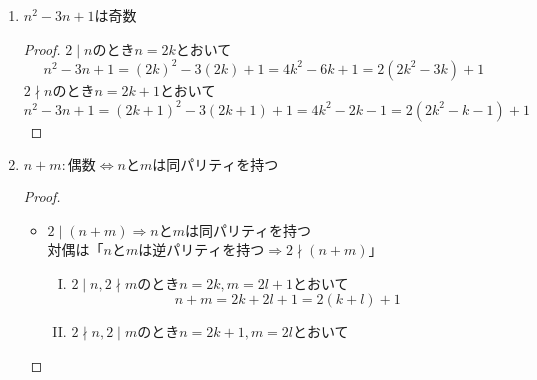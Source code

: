 \documentclass[a4paper,12pt]{ltjsarticle}
\begin{document}
\begin{enumerate}[(1)]
\begin{proof}
\begin{itemize}
                    \begin{equation*}
                        3n^3 = 3(2l + 1)^3 = 3(8l^3 + 12l^2 + 6l + 1) = 2(12l^3 + 18l^2 + 9l + 1) + 1
                    \end{equation*}
                    次に，$2 \mid n \Rightarrow 2 \mid 5n^2$を証明する． \\
                    $n = 2m$とおいて
                    \begin{equation*}
                        5n^2 = 5(2m)^2 = 2(10m^2)
                    \end{equation*}
            \end{itemize}
            以上より$2 \mid 5n^2 \Leftrightarrow 2 \mid 3n^3$
        \end{proof}
    \item $n^2 - 3n  + 1$は奇数
        \begin{proof}
            $2 \mid n$のとき$n = 2k$とおいて
            \begin{equation*}
                n^2 - 3n + 1 = (2k)^2 - 3(2k) + 1 = 4k^2 - 6k + 1 = 2(2k^2 - 3k) + 1
            \end{equation*}
            $2 \nmid n$のとき$n = 2k + 1$とおいて
            \begin{equation*}
                n^2 - 3n + 1 = (2k + 1)^2 - 3(2k + 1) + 1 = 4k^2 - 2k - 1 = 2(2k^2 - k - 1) + 1
            \end{equation*}
        \end{proof}
    \item $n + m : 偶数 \Leftrightarrow nとmは同パリティを持つ$
        \begin{proof}
            \quad \\
            \begin{itemize}
                \item $2 \mid (n + m) \Rightarrow nとmは同パリティを持つ$ \\
                    対偶は「$nとmは逆パリティを持つ \Rightarrow 2 \nmid (n + m)$」
                    \begin{enumerate}[(I)]
                        \item $2 \mid n, 2 \nmid m$のとき$n = 2k, m = 2l + 1$とおいて
                            \begin{equation*}
                                n + m = 2k + 2l + 1 = 2(k + l) + 1
                            \end{equation*}
                        \item $2 \nmid n, 2 \mid m$のとき$n = 2k + 1, m = 2l$とおいて

\end{enumerate}
\end{itemize}
\end{proof}
\end{enumerate}
\end{document}
